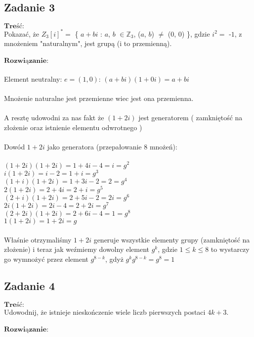 \subsection{Zadanie 3}
$\textbf{Treść:}$ \\ \newline
Pokazać, że $Z_{3}[i]^{*}
	=$ \{ $a + bi$ : $a$, $b$ $\in \mathbb{Z}_{3}$, ($a$, $b$) $\neq$ ($0$, $0$) \}, gdzie $i^{2} = $ -$1$, z
mnożeniem "naturalnym", jest grupą (i to przemienną).
\\
\\
$\textbf{Rozwiązanie:}$ \\
\\
Element neutralny: $e = (1,0)$: $(a + bi)(1 + 0i) = a + bi$
\\ \\
Mnożenie naturalne jest przemienne wiec jest ona przemienna.
\\ \\
A resztę udowodni za nas fakt że $(1 + 2i)$ jest generatorem ( zamkniętość na złożenie oraz istnienie elementu odwrotnego )
\\ \\
Dowód $1 + 2i$ jako generatora (przepałowanie 8 mnożeń):
\\ \\
$(1 + 2i)(1 + 2i) = 1 + 4i -4 = i = g^{2}$\\
$i(1 + 2i) = i - 2 = 1 + i = g^{3}$\\
$(1 + i)(1 + 2i) = 1 + 3i - 2 = 2 = g^{4}$\\
$2(1+2i) = 2 + 4i = 2 + i = g^{5}$\\
$(2 + i)(1 + 2i) = 2 + 5i -2 = 2i = g^{6}$\\
$2i(1 + 2i) = 2i - 4 = 2 + 2i = g^{7}$\\
$(2 + 2i)(1 + 2i) = 2 + 6i - 4 = 1 = g^{8}$\\
$1(1 + 2i) = 1 + 2i = {g}$\\
\\
Właśnie otrzymaliśmy $1 + 2i$ generuje wszystkie elementy grupy (zamkniętość na złożenie) i teraz jak weźmiemy dowolny element $g^{k}$, gdzie $1 \leq k \leq 8$ to wystarczy go wymnożyć przez element  $g^{8-k}$, gdyż $g^{k}g^{8-k} = g^8 = 1$

\subsection{Zadanie 4}
$\textbf{Treść:}$ \\ \newline
Udowodnij, że istnieje nieskończenie wiele liczb pierwszych postaci $4k + 3$.
\\
\\
$\textbf{Rozwiązanie:}$ \\

